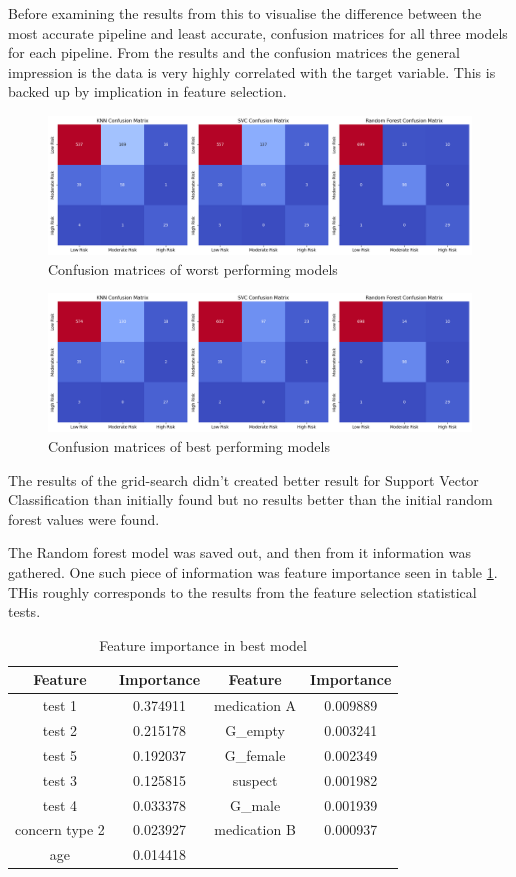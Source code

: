 \documentclass[a4paper]{article}
\begin{document}
Before examining the results from this to visualise the difference between the most accurate pipeline and least accurate, confusion matrices for all three models for each pipeline. From the results and the confusion matrices the general impression is the data is very highly correlated with the target variable. This is  backed up by implication in feature selection.

\begin{figure}
    \centering
    \includegraphics[width=0.5\linewidth]{DB KNN matrices.png}
    \caption{Confusion matrices of worst performing models}
    \label{fig:enter-label}
\end{figure}

\begin{figure}
    \centering
    \includegraphics[width=0.5\linewidth]{LOF KNN matrices.png}
    \caption{Confusion matrices of best performing models}
    \label{fig:enter-label}
\end{figure}

The results of the grid-search didn't created better result for Support Vector Classification than initially found but no results better than the initial random forest values were found. 

The Random forest model was saved out, and then from it information was gathered. One such piece of information was feature importance seen in table \ref{tab:feat importance}. THis roughly corresponds to the results from the feature selection statistical tests.

\begin{table}[H]
    \centering
    \begin{tabular}{|c|c|c|c|}
    \hline
        Feature & Importance & Feature & Importance \\
    \hline
        test 1  &  0.374911 & medication A & 0.009889\\
    \hline
        test 2  &  0.215178 & G\_empty  &  0.003241 \\
    \hline
        test 5  &  0.192037 & G\_female  &  0.002349 \\
    \hline
        test 3  &  0.125815 & suspect  &  0.001982 \\
    \hline
        test 4   & 0.033378 & G\_male   & 0.001939 \\
    \hline
        concern type 2 &   0.023927 &   medication B  &  0.000937 \\
    \hline
        age  &  0.014418 &  & \\
    \hline
    \end{tabular}
    \caption{Feature importance in best model}
    \label{tab:feat importance}
\end{table}
\end{document}
